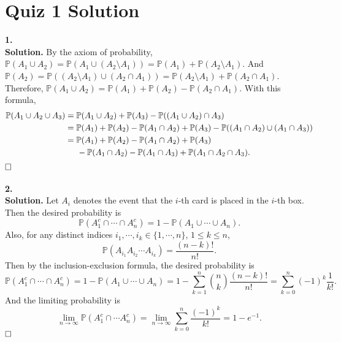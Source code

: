 \documentclass[12pt]{article}
\begin{document}
\section*{Quiz 1 Solution}
\textbf{1.}\\
\textbf{Solution.} By the axiom of probability, $\mathbb{P}(A_1\cup A_2)=\mathbb{P}(A_1\cup(A_2\setminus A_1))=\mathbb{P}(A_1)+\mathbb{P}(A_2\setminus A_1)$. And $\mathbb{P}(A_2)=\mathbb{P}((A_2\setminus A_1)\cup(A_2\cap A_1))=\mathbb{P}(A_2\setminus A_1)+\mathbb{P}(A_2\cap A_1)$. Therefore, $\mathbb{P}(A_1\cup A_2)=\mathbb{P}(A_1)+\mathbb{P}(A_2)-\mathbb{P}(A_2\cap A_1)$. With this formula,
\begin{equation*}
\begin{aligned}
\mathbb{P}(A_1\cup A_2\cup A_3) &= \mathbb{P}(A_1\cup A_2)+\mathbb{P}(A_3)-\mathbb{P}((A_1\cup A_2)\cap A_3) \\&
=\mathbb{P}(A_1)+\mathbb{P}(A_2)-\mathbb{P}(A_1\cap A_2)+\mathbb{P}(A_3)-\mathbb{P}((A_1\cap A_2)\cup(A_1\cap A_3)) \\&
=\mathbb{P}(A_1)+\mathbb{P}(A_2)-\mathbb{P}(A_1\cap A_2)+\mathbb{P}(A_3)
\\&
\hspace{5mm}-\mathbb{P}(A_1\cap A_2)-\mathbb{P}(A_1\cap A_3)+\mathbb{P}(A_1\cap A_2\cap A_3).
\end{aligned}
\end{equation*}
$\hspace{\fill}\square$
\\ \\
\textbf{2.} \\
\textbf{Solution.} Let $A_i$ denotes the event that the $i$-th card is placed in the $i$-th box. Then the desired probability is
\begin{equation*}
\mathbb{P}(A_1^c\cap\cdots\cap A_n^c)=1-\mathbb{P}(A_1\cup\cdots\cup A_n).
\end{equation*}
Also, for any distinct indices $i_1,\cdots,i_k\in\{1,\cdots,n\}$, $1\leq k\leq n$,
\begin{equation*}
\mathbb{P}(A_{i_1}A_{i_2}\cdots A_{i_k})=\frac{(n-k)!}{n!}.
\end{equation*}
Then by the inclusion-exclusion formula, the desired probability is
\begin{equation*}
\mathbb{P}(A_1^c\cap\cdots\cap A_n^c)=1-\mathbb{P}(A_1\cup\cdots\cup A_n)=1-\sum_{k=1}^n\binom{n}{k}\frac{(n-k)!}{n!}=\sum_{k=0}^n(-1)^k\frac{1}{k!}.
\end{equation*}
And the limiting probability is
\begin{equation*}
\lim_{n\rightarrow\infty}\mathbb{P}(A_1^c\cap\cdots A_n^c)=\lim_{n\rightarrow\infty}\sum_{k=0}^n\frac{(-1)^k}{k!}=1-e^{-1}.
\end{equation*}
$\hspace{\fill}\square$
\end{document}
